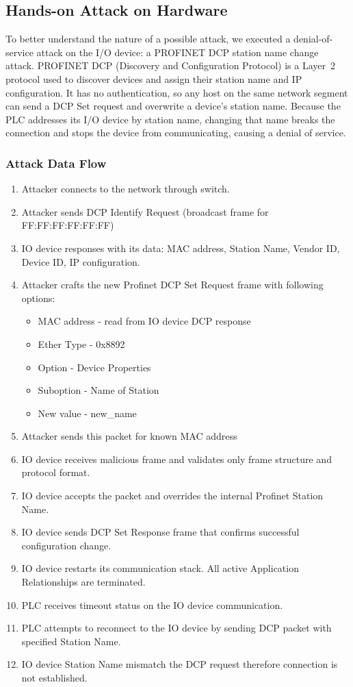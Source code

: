 \documentclass[11pt,a4paper]{article}
\begin{document}
\subsection{Hands-on Attack on Hardware}
To better understand the nature of a possible attack, we
executed a denial-of-service attack on the I/O device: a
PROFINET DCP station name change attack. PROFINET DCP
(Discovery and Configuration Protocol) is a Layer~2 protocol
used to discover devices and assign their station name and IP
configuration. It has no authentication, so any host on the
same network segment can send a DCP Set request and overwrite
a device's station name. Because the PLC addresses its I/O
device by station name, changing that name breaks the
connection and stops the device from communicating, causing a
denial of service.

\pagebreak
\subsubsection{Attack Data Flow}
\begin{enumerate}
    \item Attacker connects to the network through switch.
    \item Attacker sends DCP Identify Request (broadcast frame for FF:FF:FF:FF:FF:FF)
    \item IO device responses with its data: MAC address, Station Name, Vendor ID, Device ID, IP configuration.
    \item Attacker crafts the new Profinet DCP Set Request frame with following options:
        \begin{itemize}
            \item MAC address - read from IO device DCP response
            \item Ether Type - 0x8892
            \item Option - Device Properties
            \item Suboption - Name of Station
            \item New value - new\_name
        \end{itemize}
    \item Attacker sends this packet for known MAC address
    \item IO device receives malicious frame and validates only frame structure and protocol format.
    \item IO device accepts the packet and overrides the internal Profinet Station Name.
    \item IO device sends DCP Set Response frame that confirms successful configuration change.
    \item IO device restarts its communication stack. All active Application Relationships are terminated.
    \item PLC receives timeout status on the IO device communication.
    \item PLC attempts to reconnect to the IO device by sending DCP packet with specified Station Name.
    \item IO device Station Name mismatch the DCP request therefore connection is not established.
\end{enumerate}
\end{document}
